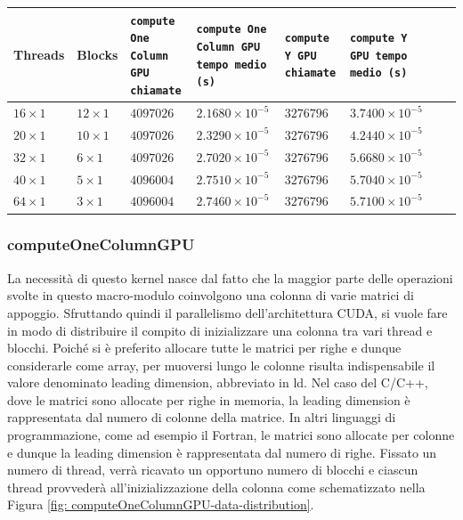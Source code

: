 \begin{table}[h!]
    \centering
    \begin{tabularx}{1\textwidth} { 
      | >{\centering\arraybackslash}X 
      | >{\centering\arraybackslash}X
      | >{\centering\arraybackslash}X
      | >{\centering\arraybackslash}X
      | >{\centering\arraybackslash}X
      | >{\centering\arraybackslash}X
      | >{\centering\arraybackslash}X
      | >{\centering\arraybackslash}X|
    }
    \hline  Threads & Blocks & \texttt{compute One Column GPU chiamate} & \texttt{compute One Column GPU tempo medio (s)} & \texttt{compute Y GPU chiamate} & \texttt{compute Y GPU tempo medio (s)} \\
    \hline $16 \times 1$ & $12 \times 1$ & $4097026$ & $2.1680 \times 10^{-5}$ & $3276796$ & $3.7400 \times 10^{-5}$ \\
    \hline $20 \times 1$ & $10 \times 1$ & $4097026$ & $2.3290 \times 10^{-5}$ & $3276796$ & $4.2440 \times 10^{-5}$ \\
    \hline $32 \times 1$ & $6 \times 1$ & $4097026$ & $2.7020 \times 10^{-5}$ & $3276796$ & $5.6680 \times 10^{-5}$ \\
    \hline $40 \times 1$ & $5 \times 1$ & $4096004$ & $2.7510 \times 10^{-5}$ & $3276796$ & $5.7040 \times 10^{-5}$ \\
    \hline $64 \times 1$ & $3 \times 1$ & $4096004$ & $2.7460 \times 10^{-5}$ & $3276796$ & $5.7100 \times 10^{-5}$ \\
    \hline
    \end{tabularx}
    \label{tab:second_macro_module_time_N_819200}
\end{table}
\vspace{0.2cm}

\subsubsection{computeOneColumnGPU}
\noindent La necessità di questo kernel nasce dal fatto che la maggior parte delle operazioni svolte in questo macro-modulo coinvolgono una colonna di varie matrici di appoggio. Sfruttando quindi il parallelismo dell'architettura CUDA, si vuole fare in modo di distribuire il compito di inizializzare una colonna tra vari thread e blocchi. Poiché si è preferito allocare tutte le matrici per righe e dunque considerarle come array, per muoversi lungo le colonne risulta indispensabile il valore denominato leading dimension, abbreviato in ld. Nel caso del C/C++, dove le matrici sono allocate per righe in memoria, la leading dimension è rappresentata dal numero di colonne della matrice. In altri linguaggi di programmazione, come ad esempio il Fortran, le matrici sono allocate per colonne e dunque la leading dimension è rappresentata dal numero di righe. Fissato un numero di thread, verrà ricavato un opportuno numero di blocchi e ciascun thread provvederà all'inizializzazione della colonna come schematizzato nella Figura \ref{fig: computeOneColumnGPU-data-distribution}.

